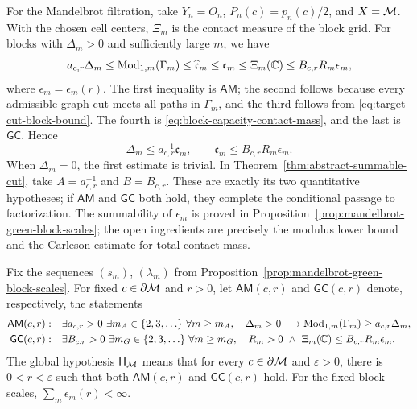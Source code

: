 For the Mandelbrot filtration, take \(Y_n=O_n\),
\(P_n(c)=p_n(c)/2\), and \(X=\mathcal M\). With the chosen cell centers,
\(\Xi_m\) is the contact measure of the block grid. For blocks with
\(\Delta_m>0\) and sufficiently large \(m\), we have
\begin{equation}
 a_{c,r}\Delta_m\le
 \operatorname{Mod}_{1,m}(\Gamma_m)
 \le\widehat{\mathfrak c}_m
 \le\mathfrak c_m
 \le\Xi_m(\mathbb C)
 \le B_{c,r} R_m\epsilon_m,
\label{eq:mandelbrot-hypothesis-chain}
\end{equation}
where \(\epsilon_m=\epsilon_m(r)\). The first inequality is
\(\mathsf{AM}\); the second follows because every admissible graph cut
meets all paths in \(\Gamma_m\), and the third follows from
\eqref{eq:target-cut-block-bound}. The fourth is
\eqref{eq:block-capacity-contact-mass}, and the last is \(\mathsf{GC}\).
Hence
\[
 \Delta_m\le a_{c,r}^{-1}\mathfrak c_m,\qquad
 \mathfrak c_m\le B_{c,r}R_m\epsilon_m.
\]
When \(\Delta_m=0\), the first estimate is trivial. In
Theorem~\ref{thm:abstract-summable-cut}, take
\(A=a_{c,r}^{-1}\) and \(B=B_{c,r}\). These are exactly its two
quantitative hypotheses; if \(\mathsf{AM}\) and \(\mathsf{GC}\) both
hold, they complete the conditional passage to factorization. The
summability of \(\epsilon_m\) is proved in
Proposition~\ref{prop:mandelbrot-green-block-scales}; the open
ingredients are precisely the modulus lower bound and the Carleson
estimate for total contact mass.

\begin{definition}
\label{def:factorization-open-hypotheses}
Fix the sequences \((s_m)\), \((\lambda_m)\) from
Proposition~\ref{prop:mandelbrot-green-block-scales}. For fixed
\(c\in\partial\mathcal M\) and \(r>0\), let \(\mathsf{AM}(c,r)\) and
\(\mathsf{GC}(c,r)\) denote, respectively, the statements
\begin{equation}
 \begin{aligned}
 \mathsf{AM}(c,r):\quad&
 \exists a_{c,r}>0\ \exists m_A\in\{2,3,\ldots\}\
 \forall m\ge m_A,\quad
 \Delta_m>0\longrightarrow
 \operatorname{Mod}_{1,m}(\Gamma_m)\ge a_{c,r}\Delta_m,\\
 \mathsf{GC}(c,r):\quad&
 \exists B_{c,r}>0\ \exists m_G\in\{2,3,\ldots\}\
 \forall m\ge m_G,\quad
 R_m>0\ \land\
 \Xi_m(\mathbb C)\le B_{c,r}R_m\epsilon_m.
 \end{aligned}
\end{equation}
The global hypothesis \(\mathsf H_{\mathcal M}\) means that for every
\(c\in\partial\mathcal M\) and \(\varepsilon>0\), there is \(0<r<\varepsilon\)
such that both \(\mathsf{AM}(c,r)\) and \(\mathsf{GC}(c,r)\) hold. For
the fixed block scales, \(\sum_m\epsilon_m(r)<\infty\).
\end{definition}

